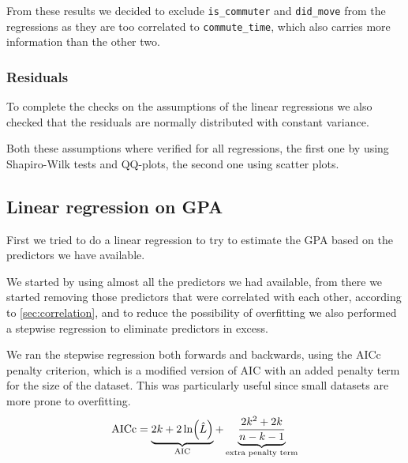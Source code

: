 \documentclass[11pt]{extarticle}
\numberwithin{table}{section}
\numberwithin{figure}{section}
\numberwithin{equation}{section}
\begin{document}
From these results we decided to exclude \texttt{is\_commuter} and \texttt{did\_move}
from the regressions as they are too correlated to \texttt{commute\_time},
which also carries more information than the other two.

\subsubsection{Residuals}

To complete the checks on the assumptions of the linear regressions
we also checked that the residuals are normally distributed with constant variance.

Both these assumptions where verified for all regressions,
the first one by using Shapiro-Wilk tests and QQ-plots, the second one using scatter plots.


\subsection{Linear regression on GPA}

First we tried to do a linear regression to try to estimate the GPA
based on the predictors we have available.

We started by using almost all the predictors we had available,
from there we started removing those predictors that were correlated with each other,
according to \cref{sec:correlation}, and to reduce the possibility of overfitting
we also performed a stepwise regression to eliminate predictors in excess.

We ran the stepwise regression both forwards and backwards,
using the AICc penalty criterion, which is a modified version of AIC with an added penalty term
for the size of the dataset.
This was particularly useful since small datasets are more prone to overfitting.
\begin{equation}
	{\operatorfont AICc} =
	\underbrace{2k + 2 \ln (\hat L)}_{\operatorfont AIC}
	+ \underbrace{\frac {2k^{2}+2k}{n-k-1}}_{\text{extra penalty term}}
\end{equation}
\end{document}
